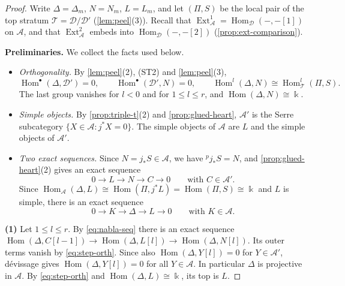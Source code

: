 \documentclass[11pt,reqno]{amsart}
\theoremstyle{plain}
\theoremstyle{definition}
\theoremstyle{remark}
\newcommand{\kk}{\Bbbk}
\DeclareMathOperator{\Hom}{Hom}
\DeclareMathOperator{\Ext}{Ext}
\newcommand{\cD}{\mathcal{D}}
\newcommand{\cA}{\mathcal{A}}
\newcommand{\cT}{\mathcal{T}}
\begin{document}
\begin{proof}
Write $\Delta=\Delta_m$, $N=N_m$, $L=L_m$, and let $(\Pi,S)$ be the local pair of the top stratum $\cT=\cD/\cD'$ (\cref{lem:peel}(3)). Recall that $\Ext^1_\cA=\Hom_\cD(-,-[1])$ on $\cA$, and that $\Ext^2_\cA$ embeds into $\Hom_\cD(-,-[2])$ (\cref{prop:ext-comparison}).

\textbf{Preliminaries.} We collect the facts used below.
\begin{itemize}
\item \emph{Orthogonality.} By \cref{lem:peel}(2), (ST2) and \cref{lem:peel}(3),
\begin{equation}\label{eq:step-orth}
\Hom^\bullet(\Delta,\cD')=0,\qquad\Hom^\bullet(\cD',N)=0,\qquad\Hom^l(\Delta,N)\cong\Hom^l_\cT(\Pi,S).
\end{equation}
The last group vanishes for $l<0$ and for $1\le l\le r$, and $\Hom(\Delta,N)\cong\kk$.
\item \emph{Simple objects.} By \cref{prop:triple-t}(2) and \cref{prop:glued-heart}, $\cA'$ is the Serre subcategory $\{X\in\cA:j^*X=0\}$. The simple objects of $\cA$ are $L$ and the simple objects of $\cA'$.
\item \emph{Two exact sequences.} Since $N=j_*S\in\cA$, we have ${}^p\!j_*S=N$, and \cref{prop:glued-heart}(2) gives an exact sequence
\begin{equation}\label{eq:nabla-seq}
0\to L\to N\to C\to0\qquad\text{with }C\in\cA'.
\end{equation}
Since $\Hom_\cA(\Delta,L)\cong\Hom(\Pi,j^*L)=\Hom(\Pi,S)\cong\kk$ and $L$ is simple, there is an exact sequence
\begin{equation}\label{eq:delta-seq}
0\to K\to\Delta\to L\to0\qquad\text{with }K\in\cA.
\end{equation}
\end{itemize}

\textbf{(1)} Let $1\le l\le r$. By \eqref{eq:nabla-seq} there is an exact sequence $\Hom(\Delta,C[l-1])\to\Hom(\Delta,L[l])\to\Hom(\Delta,N[l])$. Its outer terms vanish by \eqref{eq:step-orth}. Since also $\Hom(\Delta,Y[l])=0$ for $Y\in\cA'$, d\'evissage gives $\Hom(\Delta,Y[l])=0$ for all $Y\in\cA$. In particular $\Delta$ is projective in $\cA$. By \eqref{eq:step-orth} and $\Hom(\Delta,L)\cong\kk$, its top is $L$.


\end{proof}
\end{document}
